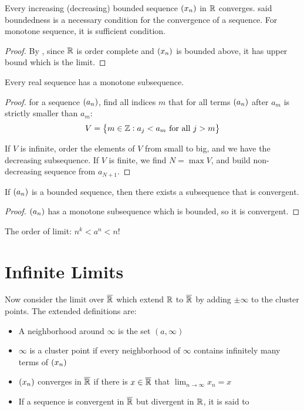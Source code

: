 \begin{theorem}
    Every increasing (decreasing) bounded sequence $\sequence{x_n}$ in $\mathbb{R}$ converges.  said boundedness is a necessary condition for the convergence of a sequence. For monotone sequence, it is sufficient condition.
\end{theorem}
\begin{proof}
    By , since $\mathbb{R}$ is order complete and $\sequence{x_n}$ is bounded above, it has upper bound which is the limit.
\end{proof}


\begin{theorem}
    Every real sequence has a monotone subsequence.    
\end{theorem}
\begin{proof}
    for a sequence $\sequence{a_n}$, find all indices $m$ that for all terms $\sequence{a_n}$ after $a_m$ is strictly smaller than $a_m$:
    \begin{equation}
        V = \set{m \in \mathbb{Z}: a_j < a_m \text{ for all } j > m}
    \end{equation}
    
    If $V$ is infinite, order the elements of $V$ from small to big, and we have the decreasing subsequence. If $V$ is finite, we find $N = \max V$, and build non-decreasing sequence from $a_{N+1}$.
\end{proof}


\begin{theorem}
    If $\sequence{a_n}$ is a bounded sequence, then there exists a subsequence that is convergent.
\end{theorem}
\begin{proof}
    $\sequence{a_n}$ has a monotone subsequence which is bounded, so it is convergent.
\end{proof}


The order of limit: $n^k < a^n < n!$



\section{Infinite Limits}

Now consider the limit over $\overline{\mathbb{R}}$ which extend $\mathbb{R}$ to $\overline{\mathbb{R}}$ by adding $\pm \infty$ to the cluster points.
 The extended definitions are:
\begin{itemize}
    \item A neighborhood around $\infty$ is the set $(a, \infty)$
    \item $\infty$ is a cluster point if every neighborhood of $\infty$ contains infinitely many terms of $\sequence{x_n}$
    \item $\sequence{x_n}$ converges in $\overline{\mathbb{R}}$ if there is $x \in \overline{\mathbb{R}}$ that $\lim_{n \rightarrow \infty} x_n = x$
    \item If a sequence is convergent in $\overline{\mathbb{R}}$ but divergent in $\mathbb{R}$, it is said to 
\end{itemize}

